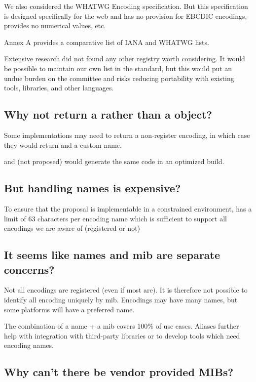 \documentclass{wg21}
\begin{document}
We also considered the WHATWG Encoding specification. But this specification is designed specifically for the web and has no provision for EBCDIC encodings, provides no numerical values, etc.

Annex A provides a comparative list of IANA and WHATWG lists.

Extensive research did not found any other registry worth considering.
It would be possible to maintain our own list in the standard, but this would put an undue burden on the committee and
risks reducing portability with existing tools, libraries, and other languages.

\subsection{Why not return a  rather than a  object?}
Some implementations may need to return a non-register encoding, in which case they would return  and a custom name.

 and  (not proposed) would generate the same code in an optimized build.


\subsection{But handling names is expensive?}
To ensure that the proposal is implementable in a constrained environment,  has a limit of 63 characters per encoding name
which is sufficient to support all encodings we are aware of (registered or not)

\subsection{It seems like names and mib are separate concerns?}

Not all encodings are registered (even if most are). It is therefore not possible to identify all encoding uniquely by mib.
Encodings may have many names, but some platforms will have a preferred name.

The combination of a name + a mib covers 100\% of use cases. Aliases further help with integration with third-party libraries or to develop
tools which need encoding names.

\subsection{Why can't there be vendor provided MIBs?}
\end{document}
